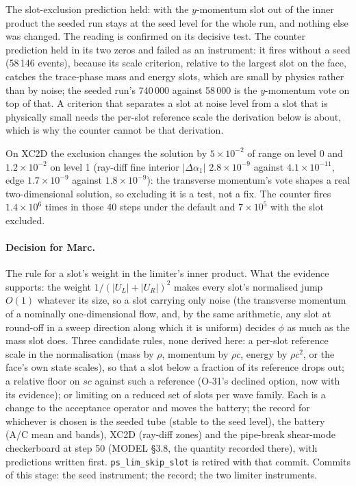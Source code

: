 \documentclass[11pt,a4paper]{article}
\newcommand{\code}[1]{\texttt{\small #1}}
\begin{document}
The slot-exclusion prediction held: with the $y$-momentum slot out of the
inner product the seeded run stays at the seed level for the whole run,
and nothing else was changed.  The reading is confirmed on its decisive
test.  The counter prediction held in its two zeros and failed as an
instrument: it fires without a seed (58\,146 events), because its scale
criterion, relative to the largest slot on the face, catches the
trace-phase mass and energy slots, which are small by physics rather
than by noise; the seeded run's 740\,000 against 58\,000 is the
$y$-momentum vote on top of that.  A criterion that separates a slot at
noise level from a slot that is physically small needs the per-slot
reference scale the derivation below is about, which is why the counter
cannot be that derivation.

On XC2D the exclusion changes the solution by $5\times10^{-2}$ of range on
level 0 and $1.2\times10^{-2}$ on level 1 (ray-diff fine interior
$|\Delta\alpha_1|$ $2.8\times10^{-9}$ against $4.1\times10^{-11}$, edge
$1.7\times10^{-9}$ against $1.8\times10^{-9}$): the transverse momentum's
vote shapes a real two-dimensional solution, so excluding it is a test,
not a fix.  The counter fires $1.4\times10^{6}$ times in those 40 steps
under the default and $7\times10^{5}$ with the slot excluded.

\paragraph{Decision for Marc.}  The rule for a slot's weight in the
limiter's inner product.  What the evidence supports: the weight
$1/(|U_L|+|U_R|)^2$ makes every slot's normalised jump $O(1)$ whatever
its size, so a slot carrying only noise (the transverse momentum of a
nominally one-dimensional flow, and, by the same arithmetic, any slot at
round-off in a sweep direction along which it is uniform) decides $\phi$
as much as the mass slot does.  Three candidate rules, none derived here:
a per-slot reference scale in the normalisation (mass by $\rho$,
momentum by $\rho c$, energy by $\rho c^2$, or the face's own state
scales), so that a slot below a fraction of its reference drops out; a
relative floor on $sc$ against such a reference (O-31's declined option,
now with its evidence); or limiting on a reduced set of slots per wave
family.  Each is a change to the acceptance operator and moves the
battery; the record for whichever is chosen is the seeded tube (stable
to the seed level), the battery (A/C mean and bands), XC2D (ray-diff
zones) and the pipe-break shear-mode checkerboard at step 50 (MODEL
\S3.8, the quantity recorded there), with predictions written first.
\code{ps\_lim\_skip\_slot} is retired with that commit.  Commits of this
stage: the seed instrument; the record; the two limiter instruments.
\end{document}
